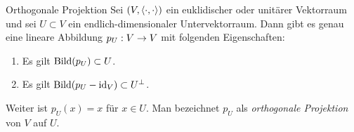 \documentclass[main.tex]{subfiles}
\begin{document}
\begin{karte}{Orthogonale Projektion}
    Sei \( (V,\langle \cdot, \cdot \rangle) \) ein 
    euklidischer oder unitärer Vektorraum und 
    sei \( U \subset V \) ein endlich-dimensionaler 
    Untervektorraum. Dann gibt es genau eine lineare 
    Abbildung \( p_U : V \rightarrow V \) mit folgenden 
    Eigenschaften:
    \begin{enumerate}
        \item Es gilt \(\operatorname{Bild}(p_U) \subset U\).
        \item Es gilt \( \operatorname{Bild}(p_U - \operatorname{id}_V)\subset U^\bot \).
    \end{enumerate}
    Weiter ist \( p_U(x) = x \) für \( x\in U \). Man 
    bezeichnet \( p_U \) als \textit{orthogonale Projektion} 
    von \(V\) auf \(U\).
\end{karte}
\end{document}
